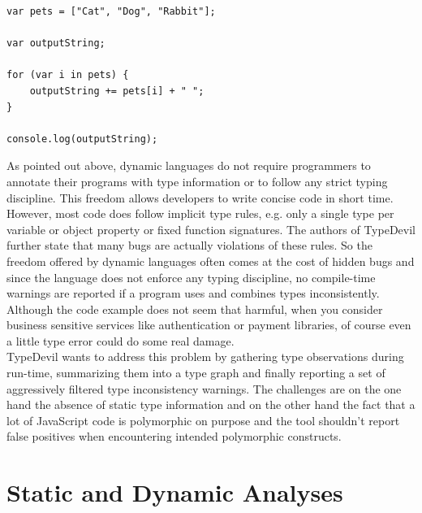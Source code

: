 \documentclass[runningheads,a4paper]{llncs}
\begin{document}
\medskip\medskip
\lstset{language=javascript}
\begin{minipage}{\linewidth}
\begin{lstlisting}[frame=single, caption=Implicit Coercions, label={listingPets}] 
var pets = ["Cat", "Dog", "Rabbit"];

var outputString;

for (var i in pets) {
    outputString += pets[i] + " ";
}

console.log(outputString);
\end{lstlisting}
\end{minipage}

As pointed out above, dynamic languages do not require programmers to annotate their programs with type information or to follow any strict typing discipline. 
This freedom allows developers to write concise code in short time. 
However, most code does follow implicit type rules, e.g. only a single type per variable or object property or fixed function signatures.
The authors of TypeDevil further state that many bugs are actually violations of these rules.
So the freedom offered by dynamic languages often comes at the cost of hidden bugs and since the language does not enforce any typing discipline, no compile-time warnings are reported if a program uses and combines types inconsistently.
Although the code example does not seem that harmful, when you consider business sensitive services like authentication or payment libraries, of course even a little type error could do some real damage. \\
TypeDevil wants to address this problem by gathering type observations during run-time, summarizing them into a type graph and finally reporting a set of aggressively filtered type inconsistency warnings.
The challenges are on the one hand the absence of static type information and on the other hand the fact that a lot of JavaScript code is polymorphic on purpose and the tool shouldn't report false positives when encountering intended polymorphic constructs.

\section{Static and Dynamic Analyses} \label{staticDynamicAnalysis}
\end{document}

